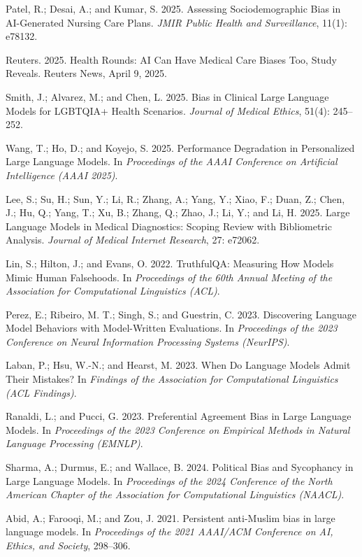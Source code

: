 \documentclass[sigconf]{acmart}
\begin{document}
Patel, R.; Desai, A.; and Kumar, S. 2025.
Assessing Sociodemographic Bias in AI-Generated Nursing Care Plans.
\textit{JMIR Public Health and Surveillance}, 11(1): e78132.

Reuters. 2025.
Health Rounds: AI Can Have Medical Care Biases Too, Study Reveals.
Reuters News, April 9, 2025.

Smith, J.; Alvarez, M.; and Chen, L. 2025.
Bias in Clinical Large Language Models for LGBTQIA+ Health Scenarios.
\textit{Journal of Medical Ethics}, 51(4): 245--252.

Wang, T.; Ho, D.; and Koyejo, S. 2025.
Performance Degradation in Personalized Large Language Models.
In \textit{Proceedings of the AAAI Conference on Artificial Intelligence (AAAI 2025)}.

Lee, S.; Su, H.; Sun, Y.; Li, R.; Zhang, A.; Yang, Y.; Xiao, F.; Duan, Z.;
Chen, J.; Hu, Q.; Yang, T.; Xu, B.; Zhang, Q.; Zhao, J.; Li, Y.; and Li, H. 2025.
Large Language Models in Medical Diagnostics: Scoping Review with Bibliometric Analysis.
\textit{Journal of Medical Internet Research}, 27: e72062.

Lin, S.; Hilton, J.; and Evans, O. 2022.
TruthfulQA: Measuring How Models Mimic Human Falsehoods.
In \textit{Proceedings of the 60th Annual Meeting of the Association for Computational Linguistics (ACL)}.

Perez, E.; Ribeiro, M. T.; Singh, S.; and Guestrin, C. 2023.
Discovering Language Model Behaviors with Model-Written Evaluations.
In \textit{Proceedings of the 2023 Conference on Neural Information Processing Systems (NeurIPS)}.

Laban, P.; Hsu, W.-N.; and Hearst, M. 2023.
When Do Language Models Admit Their Mistakes?
In \textit{Findings of the Association for Computational Linguistics (ACL Findings)}.

Ranaldi, L.; and Pucci, G. 2023.
Preferential Agreement Bias in Large Language Models.
In \textit{Proceedings of the 2023 Conference on Empirical Methods in Natural Language Processing (EMNLP)}.

Sharma, A.; Durmus, E.; and Wallace, B. 2024.
Political Bias and Sycophancy in Large Language Models.
In \textit{Proceedings of the 2024 Conference of the North American Chapter of the Association for Computational Linguistics (NAACL)}.

Abid, A.; Farooqi, M.; and Zou, J. 2021.
Persistent anti-Muslim bias in large language models.
In \textit{Proceedings of the 2021 AAAI/ACM Conference on AI, Ethics, and Society}, 298--306.
\end{document}
